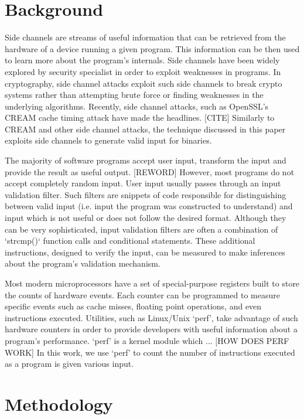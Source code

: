 \documentclass[11pt,twocolumn]{article}
\begin{document}
\section{Background}
 
Side channels are streams of useful information that can be retrieved from the hardware of a device running a given program.
This information can be then used to learn more about the program's internals.
Side channels have been widely explored by security specialist in order to exploit weaknesses in programs.
In cryptography, side channel attacks exploit such side channels to break crypto systems rather than attempting brute force or finding weaknesses in the underlying algorithms.
Recently, side channel attacks, such as OpenSSL's CREAM cache timing attack have made the headlines. [CITE]
Similarly to CREAM and other side channel attacks, the technique discussed in this paper exploits side channels to generate valid input for binaries.

The majority of software programs accept user input, transform the input and provide the result as useful output. [REWORD]
However, most programs do not accept completely random input.
User input usually passes through an input validation filter.
Such filters are snippets of code responsible for distinguishing between valid input (i.e. input the program was constructed to understand) and input which is not useful or does not follow the desired format.
Although they can be very sophisticated, input validation filters are often a combination of `strcmp()` function calls and conditional statements.
These additional instructions, designed to verify the input, can be measured to make inferences about the program's validation mechanism.

Most modern microprocessors have a set of special-purpose registers built to store the counts of hardware events.
Each counter can be programmed to measure specific events such as cache misses, floating point operations, and even instructions executed.
Utilities, such as Linux/Unix `perf', take advantage of such hardware counters in order to provide developers with useful information about a program's performance.
`perf' is a kernel module which ... [HOW DOES PERF WORK]
In this work, we use `perf' to count the number of instructions executed as a program is given various input.

\section{Methodology}
\end{document}
